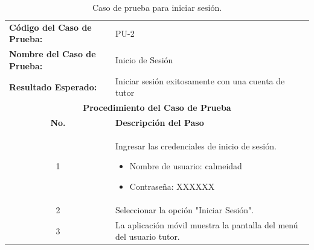 				\begin{table}[hbt!]
					\centering
					\caption{Caso de prueba para iniciar sesión.}
					\label{tab:login-test-case}
					\begin{tabularx}{\textwidth}{l X}
						\toprule
						\textbf{Código del Caso de Prueba:} & PU-2 \\
						\textbf{Nombre del Caso de Prueba:} & Inicio de Sesión \\
						\textbf{Resultado Esperado:} & Iniciar sesión exitosamente con una cuenta de tutor \\ \midrule
						\multicolumn{2}{c}{\textbf{Procedimiento del Caso de Prueba}} \\ \midrule
						\multicolumn{1}{c}{\textbf{No.}} & \textbf{Descripción del Paso} \\ \midrule
						\multicolumn{1}{c}{1} & Ingresar las credenciales de inicio de sesión.
						\begin{itemize}
							\item Nombre de usuario: calmeidad
							\item Contraseña: XXXXXX
						\end{itemize} \\
						\multicolumn{1}{c}{2} & Seleccionar la opción "Iniciar Sesión". \\
						\multicolumn{1}{c}{3} & La aplicación móvil muestra la pantalla del menú del usuario tutor. \\
						\bottomrule
					\end{tabularx}
				\end{table}
				

